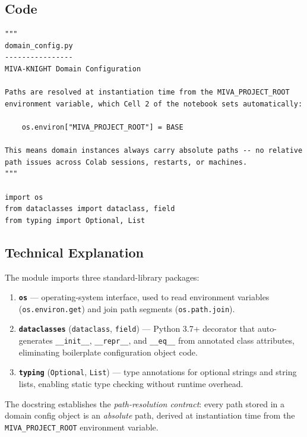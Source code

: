 \documentclass[12pt,a4paper]{article}
\theoremstyle{definition}
\theoremstyle{remark}
\begin{document}
\subsection{Code}

\begin{lstlisting}[caption={Module-level imports and docstring}]
"""
domain_config.py
----------------
MIVA-KNIGHT Domain Configuration

Paths are resolved at instantiation time from the MIVA_PROJECT_ROOT
environment variable, which Cell 2 of the notebook sets automatically:

    os.environ["MIVA_PROJECT_ROOT"] = BASE

This means domain instances always carry absolute paths -- no relative
path issues across Colab sessions, restarts, or machines.
"""

import os
from dataclasses import dataclass, field
from typing import Optional, List
\end{lstlisting}

\subsection{Technical Explanation}

The module imports three standard-library packages:

\begin{enumerate}
  \item \textbf{\texttt{os}} --- operating-system interface, used to read
        environment variables (\texttt{os.environ.get}) and join path segments
        (\texttt{os.path.join}).
  \item \textbf{\texttt{dataclasses}} (\texttt{dataclass}, \texttt{field}) ---
        Python 3.7+ decorator that auto-generates \texttt{\_\_init\_\_},
        \texttt{\_\_repr\_\_}, and \texttt{\_\_eq\_\_} from annotated class attributes,
        eliminating boilerplate configuration object code.
  \item \textbf{\texttt{typing}} (\texttt{Optional}, \texttt{List}) ---
        type annotations for optional strings and string lists, enabling
        static type checking without runtime overhead.
\end{enumerate}

The docstring establishes the \emph{path-resolution contract}: every path
stored in a domain config object is an \emph{absolute} path, derived at
instantiation time from the \texttt{MIVA\_PROJECT\_ROOT} environment variable.
\end{document}
